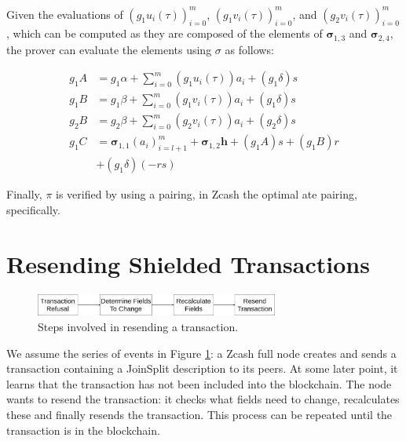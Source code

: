 \documentclass{article}
\begin{document}
Given the evaluations of $(g_1{u_i(\tau)})_{i=0}^m$, $(g_1{v_i(\tau)})_{i=0}^m$, and $(g_2{v_i(\tau)})_{i=0}^m$, which can be computed as they are composed of the elements of $\boldsymbol\sigma_{1,3}$ and $\boldsymbol\sigma_{2,4}$, the prover can evaluate the elements using $\sigma$ as follows:

\begin{align}
        g_1A &= g_1\alpha + \sum_{i=0}^m {(g_1{u_i(\tau)})}{a_i} + {(g_1{\delta})}s \label{eq:gA} \\
        g_1B &= g_1\beta + \sum_{i=0}^m {(g_1{v_i(\tau)})}{a_i} + {(g_1{\delta})}s \label{eq:g1B} \\
        g_2B &= g_2\beta + \sum_{i=0}^m {(g_2{v_i(\tau)})}{a_i} + {(g_2{\delta})}s \label{eq:g2B} \\
        g_1C &= \boldsymbol\sigma_{1,1}(a_i)_{i=l+1}^m + \boldsymbol\sigma_{1,2}\boldsymbol{h} + {(g_1A)}s + {(g_1B)}r \nonumber \\
        &+ {(g_1\delta)}{(-rs)} \label{eq:gC} 
\end{align}

Finally, $\pi$ is verified by using a pairing, in Zcash the optimal ate pairing\cite{vercauteren:optimal-ate}, specifically.

\section{Resending Shielded Transactions}

\begin{figure}[t]
\includegraphics[width=8cm]{images/timeline.png}
\caption{Steps involved in resending a transaction.} \label{fig:resend-steps}
\centering
\end{figure}

We assume the series of events in Figure \ref{fig:resend-steps}: a Zcash full node creates and sends a transaction containing a JoinSplit description to its peers.
At some later point, it learns that the transaction has not been included into the blockchain.
The node wants to resend the transaction: it checks what fields need to change, recalculates these and finally resends the transaction.
This process can be repeated until the transaction is in the blockchain.
\end{document}
